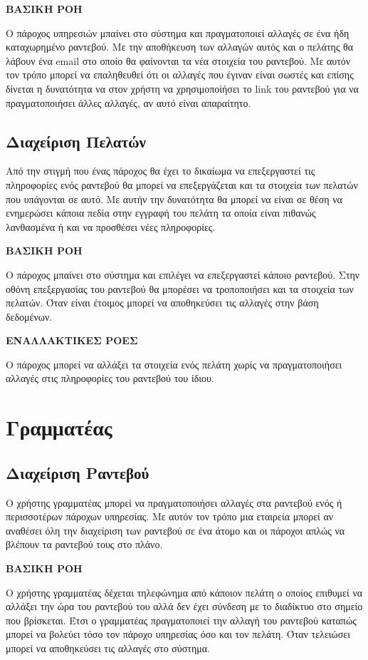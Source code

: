 \textbf{ΒΑΣΙΚΗ ΡΟΗ}

Ο πάροχος υπηρεσιών μπαίνει στο σύστημα και πραγματοποιεί αλλαγές σε ένα ήδη καταχωρημένο ραντεβού. Με την αποθήκευση των αλλαγών αυτός και ο πελάτης θα λάβουν ένα email στο οποίο θα φαίνονται τα νέα στοιχεία του ραντεβού. Με αυτόν τον τρόπο μπορεί να επαληθευθεί ότι οι αλλαγές που έγιναν είναι σωστές και επίσης δίνεται η δυνατότητα να στον χρήστη να χρησιμοποίήσει το link του ραντεβού για να πραγματοποιήσει άλλες αλλαγές, αν αυτό είναι απαραίτητο.

\subsection {Διαχείριση Πελατών}
Από την στιγμή που ένας πάροχος θα έχει το δικαίωμα να επεξεργαστεί τις πληροφορίες ενός ραντεβού θα μπορεί να επεξεργάζεται και τα στοιχεία των πελατών που υπάγονται σε αυτό. Με αυτήν την δυνατότητα θα μπορεί να είναι σε θέση να ενημερώσει κάποια πεδία στην εγγραφή του πελάτη τα οποία είναι πιθανώς λανθασμένα ή και να προσθέσει νέες πληροφορίες.

\textbf{ΒΑΣΙΚΗ ΡΟΗ}

Ο πάροχος μπαίνει στο σύστημα και επιλέγει να επεξεργαστεί κάποιο ραντεβού. Στην οθόνη επεξεργασίας του ραντεβού θα μπορέσει να τροποποιήσει και τα στοιχεία των πελατών. Όταν είναι έτοιμος μπορεί να αποθηκεύσει τις αλλαγές στην βάση δεδομένων.

\textbf{ΕΝΑΛΛΑΚΤΙΚΕΣ ΡΟΕΣ}

Ο πάροχος μπορεί να αλλάξει τα στοιχεία ενός πελάτη χωρίς να πραγματοποιήσει αλλαγές στις πληροφορίες του ραντεβού του ίδιου.

\section{Γραμματέας}
\subsection{Διαχείριση Ραντεβού}
Ο χρήστης γραμματέας μπορεί να πραγματοποιήσει αλλαγές στα ραντεβού ενός ή περισσοτέρων πάροχων υπηρεσίας. Με αυτόν τον τρόπο μια εταιρεία μπορεί αν αναθέσει όλη την διαχείριση των ραντεβού σε ένα άτομο και οι πάροχοι απλώς να βλέπουν τα ραντεβού τους στο πλάνο.

\textbf{ΒΑΣΙΚΗ ΡΟΗ}

Ο χρήστης γραμματέας δέχεται τηλεφώνημα από κάποιον πελάτη ο οποίος επιθυμεί να αλλάξει την ώρα του ραντεβού του αλλά δεν έχει σύνδεση με το διαδίκτυο στο σημείο που βρίσκεται. Έτσι ο γραμματέας πραγματοποιεί την αλλαγή του ραντεβού καταπώς μπορεί να βολεύει τόσο τον πάροχο υπηρεσίας όσο και τον πελάτη. Όταν τελειώσει μπορεί να αποθηκεύσει τις αλλαγές στο σύστημα.

